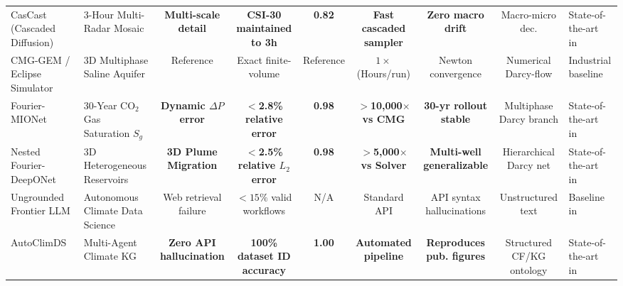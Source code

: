 \begin{table}[t]
{\begin{tabular}{@{}llccccccp{4.2cm}@{}}
CasCast (Cascaded Diffusion)~\cite{gong2024cascast} & 3-Hour Multi-Radar Mosaic & \textbf{Multi-scale detail} & \textbf{CSI-30 maintained to 3h} & \textbf{0.82} & \textbf{Fast cascaded sampler} & \textbf{Zero macro drift} & Macro-micro dec. & State-of-the-art in~\cite{gong2024cascast} \\
CMG-GEM / Eclipse Simulator & 3D Multiphase Saline Aquifer & Reference & Exact finite-volume & Reference & $1\times$ (Hours/run) & Newton convergence & Numerical Darcy-flow & Industrial baseline~\cite{jiang2024fouriermionet} \\
Fourier-MIONet~\cite{jiang2024fouriermionet} & 30-Year CO$_2$ Gas Saturation $S_g$ & \textbf{Dynamic $\Delta P$ error} & \textbf{$<$2.8\% relative error} & \textbf{0.98} & \textbf{$>$10,000$\times$ vs CMG} & \textbf{30-yr rollout stable} & Multiphase Darcy branch & State-of-the-art in~\cite{jiang2024fouriermionet} \\
Nested Fourier-DeepONet~\cite{lee2024nested} & 3D Heterogeneous Reservoirs & \textbf{3D Plume Migration} & \textbf{$<$2.5\% relative $L_2$ error} & \textbf{0.98} & \textbf{$>$5,000$\times$ vs Solver} & \textbf{Multi-well generalizable}& Hierarchical Darcy net & State-of-the-art in~\cite{lee2024nested} \\
Ungrounded Frontier LLM & Autonomous Climate Data Science & Web retrieval failure & $<15\%$ valid workflows & N/A & Standard API & API syntax hallucinations & Unstructured text & Baseline in~\cite{jaber2025autoclimds} \\
AutoClimDS~\cite{jaber2025autoclimds} & Multi-Agent Climate KG & \textbf{Zero API hallucination} & \textbf{100\% dataset ID accuracy} & \textbf{1.00} & \textbf{Automated pipeline} & \textbf{Reproduces pub. figures}& Structured CF/KG ontology & State-of-the-art in~\cite{jaber2025autoclimds} \\
\bottomrule
\end{tabular}%
}
\end{table}

